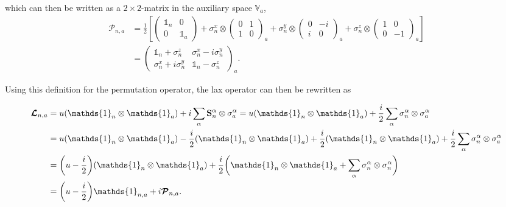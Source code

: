 \documentclass{homework}
\begin{document}
which can then be written as a $2 \times 2$-matrix in the auxiliary space $\mathds{V}_a$, 
\begin{equation} 
\begin{split}
    \bm{\mathcal P}_{n,a} &= \frac{1}{2} \left[ \left(\begin{array}{cc}
        \mathds{1}_n & 0  \\
        0 & \mathds{1}_a 
    \end{array}\right) + \sigma^{x}_{n} \otimes \left(\begin{array}{cc}
        0 & 1 \\
        1 & 0
    \end{array}\right)_a + \sigma^{y}_{n} \otimes \left(\begin{array}{cc}
        0 & -i \\
        i & 0 
    \end{array}\right)_a + \sigma^{z}_{n} \otimes \left(\begin{array}{cc}
        1 & 0  \\
        0 & -1
    \end{array}\right)_a \right] \\
    &= \left(\begin{array}{cc}
       \mathds{1}_n + \sigma^{z}_{n} &  \sigma^{x}_{n} - i\sigma^{y}_{n} \\
       \sigma^{x}_{n} + i\sigma^{y}_{n}  & \mathds{1}_n - \sigma^{z}_{n}
    \end{array}\right)_a.
    \end{split}
\end{equation}

Using this definition for the permutation operator, the lax operator can then be rewritten as

\begin{equation}
    \begin{split}
       \bm{\mathcal{L}}_{n, a} &= u(\mathds{1}_n \otimes \mathds{1}_a) + i \sum_{\alpha} \spin_n^\alpha \otimes \sigma_{a}^\alpha = u(\mathds{1}_n \otimes \mathds{1}_a) + \frac{i}{2} \sum_{\alpha} \sigma_n^\alpha \otimes \sigma_{a}^\alpha \\
       &= u(\mathds{1}_n \otimes \mathds{1}_a) - \frac{i}{2} (\mathds{1}_n \otimes \mathds{1}_a) + \frac{i}{2} (\mathds{1}_n \otimes \mathds{1}_a) + \frac{i}{2} \sum_{\alpha} \sigma_n^\alpha \otimes \sigma_{a}^\alpha \\
       &= \bigg(u-\frac{i}{2}\bigg) (\mathds{1}_n \otimes \mathds{1}_a) + \frac{i}{2} \bigg( \mathds{1}_n \otimes \mathds{1}_a + \sum_{\alpha}\sigma_n^{\alpha}  \otimes \sigma_n^{\alpha} \bigg) \\
       &= \bigg(u-\frac{i}{2}\bigg) \mathds{1}_{n, a} + i \bm{\mathcal{P}}_{n, a}.
       \end{split}
       \label{l-matrix def}
\end{equation}
\end{document}
